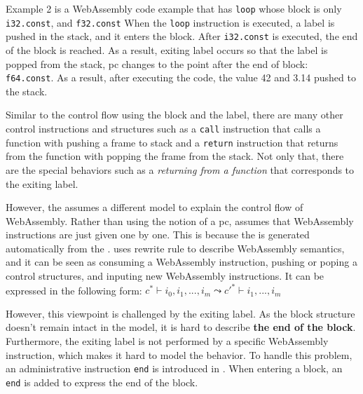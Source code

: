 Example 2 is a WebAssembly code example that has \texttt{loop} whose block is
only \texttt{i32.const}, and \texttt{f32.const}
When the \texttt{loop} instruction is executed, a label is pushed in the stack,
and it enters the block.
After \texttt{i32.const} is executed, the end of the block is reached.
As a result, exiting label occurs so that the label is popped from the stack,
pc changes to the point after the end of block: \texttt{f64.const}.
As a result, after executing the code, the value 42 and 3.14 pushed to the
stack.


Similar to the control flow using the block and the label, there are many other
control instructions and structures such as a \texttt{call} instruction that
calls a function with pushing a frame to stack and a \texttt{return}
instruction that returns from the function with popping the frame from the
stack.
Not only that, there are the special behaviors such as a \textit{returning from
a function} that corresponds to the exiting label.


However, the \spectecp{} assumes a different model to explain the control flow
of WebAssembly.
Rather than using the notion of a pc, \spectecp{} assumes that WebAssembly
instructions are just given one by one.
This is because the \spectecp{} is generated automatically from the
.
 uses rewrite rule to describe WebAssembly semantics, and it
can be seen as consuming a WebAssembly instruction, pushing or poping a control
structures, and inputing new WebAssembly instructions.
It can be expressed in the following form:
$c^* \vdash i_0, i_1, ..., i_m \leadsto c'^* \vdash i_1, ..., i_m$


However, this viewpoint is challenged by the exiting label.
As the block structure doesn't remain intact in the model, it is hard to
describe \textbf{the end of the block}.
Furthermore, the exiting label is not performed by a specific WebAssembly
instruction, which makes it hard to model the behavior.
To handle this problem, an administrative instruction \texttt{end} is
introduced in \spectecp.
When entering a block, an \texttt{end} is added to express the end of the block.


